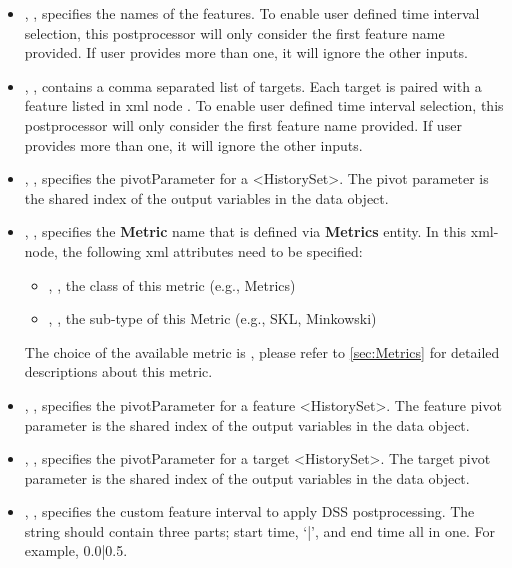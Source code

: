 \begin{itemize}
  \item {}, , specifies the names of the features. To enable user defined
    time interval selection, this postprocessor will only consider the first feature name provided. If user provides more than one,
    it will ignore the other inputs.
  \item {}, , contains a comma separated list of
    targets. \nb Each target is paired with a feature listed in xml node . To enable user defined
    time interval selection, this postprocessor will only consider the first feature name provided. If user provides more than one,
    it will ignore the other inputs.
  \item {}, , specifies the pivotParameter for a <HistorySet>.
    The pivot parameter is the shared index of the output variables in the data object.
  \item {}, , specifies the \textbf{Metric} name that is defined via
    \textbf{Metrics} entity. In this xml-node, the following xml attributes need to be specified:
    \begin{itemize}
      \item {}, , the class of this metric (e.g., Metrics)
      \item {}, , the sub-type of this Metric (e.g., SKL, Minkowski)
    \end{itemize}
    \nb The choice of the available metric is , please
    refer to \ref{sec:Metrics} for detailed descriptions about this metric.
    \item {}, , specifies the pivotParameter for a feature <HistorySet>. The feature pivot parameter is the shared index of the output variables in the data object.
    \item {}, , specifies the pivotParameter for a target <HistorySet>. The target pivot parameter is the shared index of the output variables in the data object.
    \item {}, , specifies the custom feature interval to apply DSS postprocessing. The string should contain three parts; start time, `|', and end time all in one. For example, 0.0|0.5.

\end{itemize}
